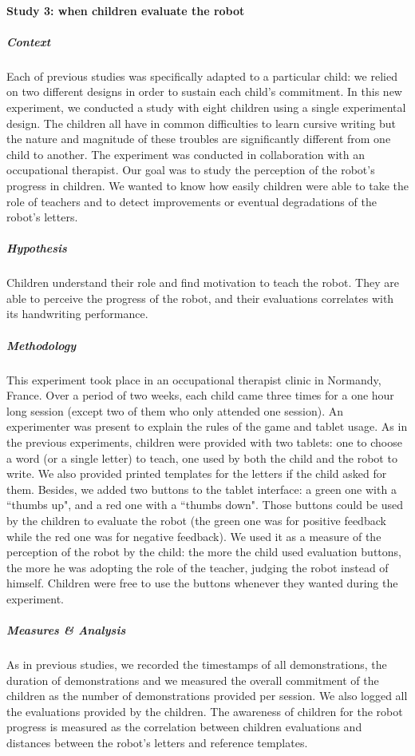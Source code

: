 \documentclass[10pt,a4paper]{article}
\begin{document}
\paragraph{Study 3: when children evaluate the robot}
\subparagraph{Context}
Each of previous studies was specifically adapted to a particular child: we relied on two different
designs in order to sustain each child's commitment.
In this new experiment, we conducted a study with eight children using a single experimental design. The children all have in common difficulties to learn
cursive writing but the nature and magnitude of these troubles are significantly
different from one child to another. The experiment was conducted in collaboration with an occupational therapist. Our goal was to study the perception of the robot's progress in children. We wanted to know how easily children were able to take the role of teachers and to detect improvements or eventual degradations of the robot's letters.
\subparagraph{Hypothesis}
Children understand their role and find motivation to teach the robot. They are able to perceive the progress of the robot, and their evaluations correlates with its handwriting performance.
\subparagraph{Methodology}
This experiment took place in an occupational therapist clinic
in Normandy, France. Over a period of two weeks, each child came three times for a one hour long
session (except two of them who only attended one session). An experimenter was present to explain the rules of the game and tablet usage. As in the previous experiments, children were provided with two tablets: one to choose a word (or a single letter) to teach, one
used by both the child and the robot to write. We also provided printed templates for the letters if the child asked for them. 
Besides, we added two buttons to the tablet interface: a green one with a ``thumbs up", and
a red one with a ``thumbs down". Those buttons could be used by the children to evaluate the
robot (the green one was for positive feedback while the red one was for negative feedback). 
We used it as a measure of the perception of the robot by the child: the more the
child used evaluation buttons, the more he was adopting the role of the teacher, judging the
robot instead of himself. Children were free to use the buttons whenever they wanted during the experiment.
\subparagraph{Measures \& Analysis}
As in previous studies, we recorded the timestamps of all demonstrations, the duration of demonstrations and we measured the overall commitment of the children as the number of demonstrations provided per session. 
We also logged all the evaluations provided by the children. The awareness of children for the robot progress is measured as the correlation between children evaluations and distances between the robot's letters and reference templates.
\end{document}
